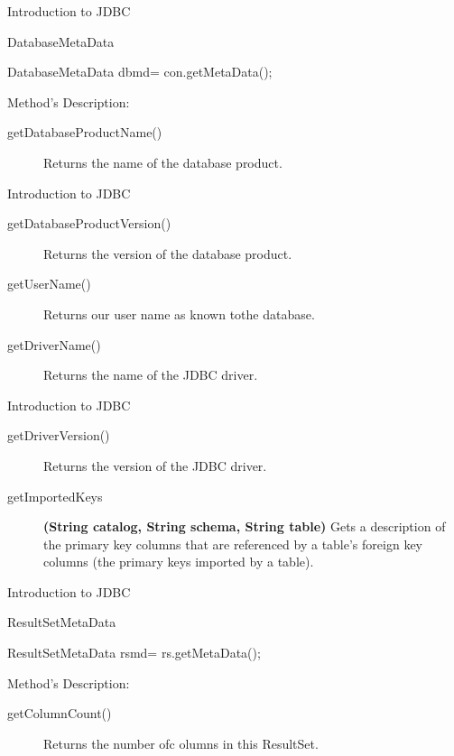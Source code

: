 \documentclass[14pt]{beamer}
\begin{document}
\begin{frame}[fragile]{Introduction to JDBC}
\begin{block}{}
DatabaseMetaData
\end{block}
\begin{block}{}
DatabaseMetaData dbmd= con.getMetaData(); 
\end{block}
Method's Description:
\begin{description}
\item [getDatabaseProductName()] Returns the name of the database product.
\end{description}
\end{frame}
\begin{frame}[fragile]{Introduction to JDBC}
\begin{description}
\item [getDatabaseProductVersion()] Returns the version of the database product.
\item [getUserName()] Returns our user name as known tothe database.
\item [getDriverName()] Returns the name of the JDBC driver.
\end{description}
\end{frame}


\begin{frame}[fragile]{Introduction to JDBC}
\begin{description}
\item [getDriverVersion()] Returns the version of the JDBC driver.
\item [getImportedKeys]\textbf{(String catalog, String schema, String table)} Gets a description of the primary key columns that are referenced by a table's foreign key columns (the primary keys imported by a table).
\end{description}
\end{frame}

\begin{frame}[fragile]{Introduction to JDBC}
\begin{block}{}
ResultSetMetaData
\end{block}
\begin{block}{}
ResultSetMetaData rsmd= rs.getMetaData(); 
\end{block}
Method's Description:
\begin{description}
\item [getColumnCount()] Returns the number ofc olumns in this ResultSet.
\end{description}
\end{frame}
\end{document}

